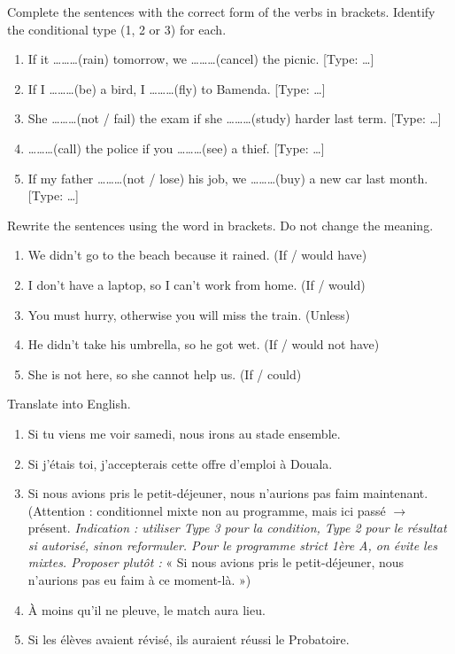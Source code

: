 \documentclass[11pt]{article}
\begin{document}
\begin{exercice}
Complete the sentences with the correct form of the verbs in brackets. Identify the conditional type (1, 2 or 3) for each.
\begin{enumerate}
\item If it \ldots\ldots\ldots (rain) tomorrow, we \ldots\ldots\ldots (cancel) the picnic. [Type: \ldots]
\item If I \ldots\ldots\ldots (be) a bird, I \ldots\ldots\ldots (fly) to Bamenda. [Type: \ldots]
\item She \ldots\ldots\ldots (not / fail) the exam if she \ldots\ldots\ldots (study) harder last term. [Type: \ldots]
\item \ldots\ldots\ldots (call) the police if you \ldots\ldots\ldots (see) a thief. [Type: \ldots]
\item If my father \ldots\ldots\ldots (not / lose) his job, we \ldots\ldots\ldots (buy) a new car last month. [Type: \ldots]
\end{enumerate}
\end{exercice}

\begin{exercice}
Rewrite the sentences using the word in brackets. Do not change the meaning.
\begin{enumerate}
\item We didn't go to the beach because it rained. (If / would have)
\item I don't have a laptop, so I can't work from home. (If / would)
\item You must hurry, otherwise you will miss the train. (Unless)
\item He didn't take his umbrella, so he got wet. (If / would not have)
\item She is not here, so she cannot help us. (If / could)
\end{enumerate}
\end{exercice}

\begin{exercice}
Translate into English.
\begin{enumerate}
\item Si tu viens me voir samedi, nous irons au stade ensemble.
\item Si j'étais toi, j'accepterais cette offre d'emploi à Douala.
\item Si nous avions pris le petit-déjeuner, nous n'aurions pas faim maintenant. (Attention : conditionnel mixte non au programme, mais ici passé $\rightarrow$ présent. \textit{Indication : utiliser Type 3 pour la condition, Type 2 pour le résultat si autorisé, sinon reformuler. Pour le programme strict 1ère A, on évite les mixtes. Proposer plutôt :} « Si nous avions pris le petit-déjeuner, nous n'aurions pas eu faim à ce moment-là. »)
\item À moins qu'il ne pleuve, le match aura lieu.
\item Si les élèves avaient révisé, ils auraient réussi le Probatoire.
\end{enumerate}
\end{exercice}
\end{document}

